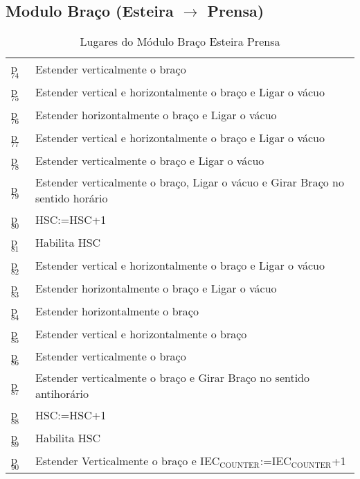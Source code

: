 \documentclass[11pt]{article}
\begin{document}
\subsection{Modulo  Braço (Esteira $\rightarrow$ Prensa)}
\label{sec-1-4}
\begin{table}[htb]
\caption{Lugares do Módulo Braço Esteira Prensa}
\centering
\begin{tabular}{ll}
p$_{\text{74}}$ & Estender verticalmente o braço\\
p$_{\text{75}}$ & Estender vertical e horizontalmente o braço e Ligar o vácuo\\
p$_{\text{76}}$ & Estender horizontalmente o braço e Ligar o vácuo\\
p$_{\text{77}}$ & Estender vertical e horizontalmente o braço e Ligar o vácuo\\
p$_{\text{78}}$ & Estender verticalmente o braço e Ligar o vácuo\\
p$_{\text{79}}$ & Estender verticalmente o braço, Ligar o vácuo e Girar Braço no sentido horário\\
p$_{\text{80}}$ & HSC:=HSC+1\\
p$_{\text{81}}$ & Habilita HSC\\
p$_{\text{82}}$ & Estender vertical e horizontalmente o braço e Ligar o vácuo\\
p$_{\text{83}}$ & Estender horizontalmente o braço e Ligar o vácuo\\
p$_{\text{84}}$ & Estender horizontalmente o braço\\
p$_{\text{85}}$ & Estender vertical e horizontalmente o braço\\
p$_{\text{86}}$ & Estender verticalmente o braço\\
p$_{\text{87}}$ & Estender verticalmente o braço e Girar Braço no sentido antihorário\\
p$_{\text{88}}$ & HSC:=HSC+1\\
p$_{\text{89}}$ & Habilita HSC\\
p$_{\text{90}}$ & Estender Verticalmente o braço e IEC$_{\text{COUNTER}}$:=IEC$_{\text{COUNTER}}$+1\\
\end{tabular}
\end{table}
\end{document}
